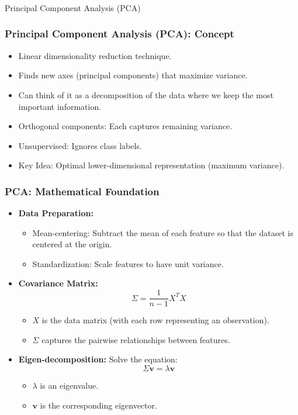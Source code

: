 \documentclass[aspectratio=169]{beamer}
\begin{document}
\begin{frame}\frametitle{}
    \begin{center}
        {\LARGE Principal Component Analysis (PCA)}
    \end{center}
\end{frame}

\begin{frame}
\frametitle{Principal Component Analysis (PCA): Concept}
\begin{itemize}
    \item Linear dimensionality reduction technique.
    \item Finds new axes (principal components) that maximize variance.
    \item Can think of it as a decomposition of the data where we keep the most important information.
    \item Orthogonal components: Each captures remaining variance.
    \item Unsupervised: Ignores class labels.
    \item Key Idea: Optimal lower-dimensional representation (maximum variance).
\end{itemize}
\end{frame}

\begin{frame}
\frametitle{PCA: Mathematical Foundation}
    \begin{itemize}
        \item \textbf{Data Preparation:} 
            \begin{itemize}
                \item Mean-centering: Subtract the mean of each feature so that the dataset is centered at the origin.
                \item Standardization: Scale features to have unit variance.
            \end{itemize}
        \item \textbf{Covariance Matrix:} 
            \[
            \Sigma = \frac{1}{n-1}X^TX
            \]
            \begin{itemize}
                \item \(X\) is the data matrix (with each row representing an observation).
                \item \(\Sigma\) captures the pairwise relationships between features.
            \end{itemize}
        \item \textbf{Eigen-decomposition:} Solve the equation:
            \[
            \Sigma \mathbf{v} = \lambda \mathbf{v}
            \]
            \begin{itemize}
                \item \(\lambda\) is an eigenvalue.
                \item \(\mathbf{v}\) is the corresponding eigenvector.
            \end{itemize}
    \end{itemize}
\end{frame}
\end{document}
